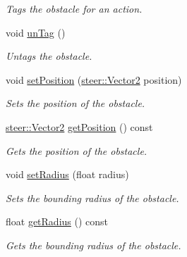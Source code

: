 \begin{DoxyCompactItemize}
\begin{DoxyCompactList}\small\item\em Tags the obstacle for an action. \end{DoxyCompactList}\item 
\hypertarget{classsteer_1_1_sphere_obstacle_a60d4eb59561f9de8db964e9b46d029db}{void \hyperlink{classsteer_1_1_sphere_obstacle_a60d4eb59561f9de8db964e9b46d029db}{un\-Tag} ()}\label{classsteer_1_1_sphere_obstacle_a60d4eb59561f9de8db964e9b46d029db}

\begin{DoxyCompactList}\small\item\em Untags the obstacle. \end{DoxyCompactList}\item 
void \hyperlink{classsteer_1_1_sphere_obstacle_ac545e11d4cb6bb301b2a254d0e105c21}{set\-Position} (\hyperlink{structsteer_1_1_vector2}{steer\-::\-Vector2} position)
\begin{DoxyCompactList}\small\item\em Sets the position of the obstacle. \end{DoxyCompactList}\item 
\hypertarget{classsteer_1_1_sphere_obstacle_ab1b7c8915217274eacba34a2c079f0ab}{\hyperlink{structsteer_1_1_vector2}{steer\-::\-Vector2} \hyperlink{classsteer_1_1_sphere_obstacle_ab1b7c8915217274eacba34a2c079f0ab}{get\-Position} () const }\label{classsteer_1_1_sphere_obstacle_ab1b7c8915217274eacba34a2c079f0ab}

\begin{DoxyCompactList}\small\item\em Gets the position of the obstacle. \end{DoxyCompactList}\item 
void \hyperlink{classsteer_1_1_sphere_obstacle_a758de757c79142c1617c1bfeccb701bb}{set\-Radius} (float radius)
\begin{DoxyCompactList}\small\item\em Sets the bounding radius of the obstacle. \end{DoxyCompactList}\item 
\hypertarget{classsteer_1_1_sphere_obstacle_a44693e237377c5681ff78868feab5873}{float \hyperlink{classsteer_1_1_sphere_obstacle_a44693e237377c5681ff78868feab5873}{get\-Radius} () const }\label{classsteer_1_1_sphere_obstacle_a44693e237377c5681ff78868feab5873}

\begin{DoxyCompactList}\small\item\em Gets the bounding radius of the obstacle. \end{DoxyCompactList}\end{DoxyCompactItemize}
